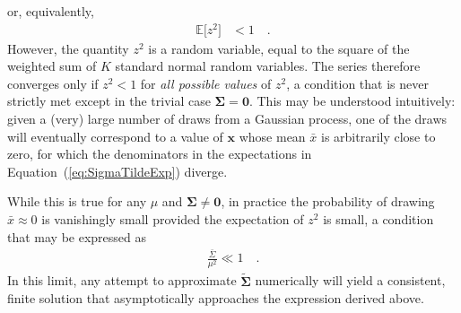 \documentclass[modern]{aastex62}
\begin{document}
%
or, equivalently,
%
\begin{align}
    \mathbb{E}\big[z^2\big] & < 1
    \quad.
\end{align}
%
However, the quantity $z^2$ is a random variable, equal to the square of
the weighted sum of $K$ standard normal random variables. The series therefore
converges only if $z^2 < 1$ for \emph{all possible values} of $z^2$, a condition
that is never strictly met except in the trivial case $\pmb{\Sigma} = \mathbf{0}$.
This may be understood intuitively: given a (very) large number of draws from
a Gaussian process, one of the draws will eventually correspond to a value of
$\mathbf{x}$ whose
mean $\bar{x}$ is arbitrarily close to zero, for which the denominators in the
expectations in Equation~(\ref{eq:SigmaTildeExp}) diverge.

While this is true for any
$\mu$ and $\pmb{\Sigma} \ne \mathbf{0}$, in practice the probability of
drawing $\bar{x} \approx 0$ is vanishingly small provided the expectation of
$z^2$ is small, a condition that may be expressed as
%
\begin{align}
    \frac{\bar{\Sigma}}{\mu^2} \ll 1
    \quad.
\end{align}
%
In this limit, any attempt to approximate $\tilde{\pmb{\Sigma}}$
numerically will yield a consistent, finite solution that
asymptotically approaches the expression derived above.

\ifdefined {}

    \clearpage

    \appendix
\end{document}
